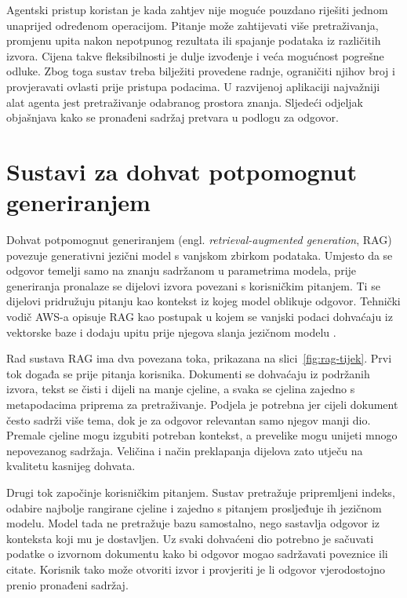 Agentski pristup koristan je kada zahtjev nije moguće pouzdano riješiti jednom unaprijed određenom operacijom. Pitanje može zahtijevati više pretraživanja, promjenu upita nakon nepotpunog rezultata ili spajanje podataka iz različitih izvora. Cijena takve fleksibilnosti je dulje izvođenje i veća mogućnost pogrešne odluke. Zbog toga sustav treba bilježiti provedene radnje, ograničiti njihov broj i provjeravati ovlasti prije pristupa podacima. U razvijenoj aplikaciji najvažniji alat agenta jest pretraživanje odabranog prostora znanja. Sljedeći odjeljak objašnjava kako se pronađeni sadržaj pretvara u podlogu za odgovor.

\section{Sustavi za dohvat potpomognut generiranjem}

Dohvat potpomognut generiranjem (engl. \textit{retrieval-augmented generation}, RAG) povezuje generativni jezični model s vanjskom zbirkom podataka. Umjesto da se odgovor temelji samo na znanju sadržanom u parametrima modela, prije generiranja pronalaze se dijelovi izvora povezani s korisničkim pitanjem. Ti se dijelovi pridružuju pitanju kao kontekst iz kojeg model oblikuje odgovor. Tehnički vodič AWS-a opisuje RAG kao postupak u kojem se vanjski podaci dohvaćaju iz vektorske baze i dodaju upitu prije njegova slanja jezičnom modelu \cite{awsRagGuide}.

Rad sustava RAG ima dva povezana toka, prikazana na slici~\ref{fig:rag-tijek}. Prvi tok događa se prije pitanja korisnika. Dokumenti se dohvaćaju iz podržanih izvora, tekst se čisti i dijeli na manje cjeline, a svaka se cjelina zajedno s metapodacima priprema za pretraživanje. Podjela je potrebna jer cijeli dokument često sadrži više tema, dok je za odgovor relevantan samo njegov manji dio. Premale cjeline mogu izgubiti potreban kontekst, a prevelike mogu unijeti mnogo nepovezanog sadržaja. Veličina i način preklapanja dijelova zato utječu na kvalitetu kasnijeg dohvata.

Drugi tok započinje korisničkim pitanjem. Sustav pretražuje pripremljeni indeks, odabire najbolje rangirane cjeline i zajedno s pitanjem prosljeđuje ih jezičnom modelu. Model tada ne pretražuje bazu samostalno, nego sastavlja odgovor iz konteksta koji mu je dostavljen. Uz svaki dohvaćeni dio potrebno je sačuvati podatke o izvornom dokumentu kako bi odgovor mogao sadržavati poveznice ili citate. Korisnik tako može otvoriti izvor i provjeriti je li odgovor vjerodostojno prenio pronađeni sadržaj.


